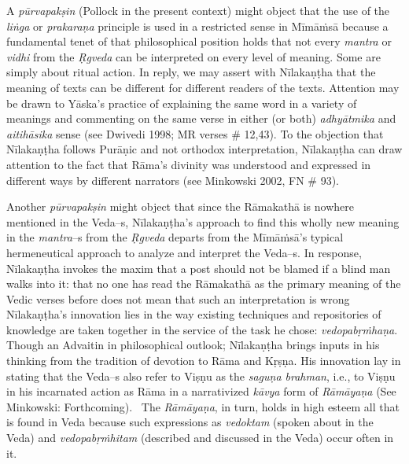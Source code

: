 A \textit{pūrvapakṣin} (Pollock in the present context) might object that the use of the \textit{liṅga} or \textit{prakaraṇa} principle is used in a restricted sense in Mīmāṁsā because a fundamental tenet of that philosophical position holds that not every \textit{mantra} or \textit{vidhi} from the \textit{Ṛgveda} can be interpreted on every level of meaning. Some are simply about ritual action. In reply, we may assert with Nīlakaṇṭha that the meaning of texts can be different for different readers of the texts. Attention may be drawn to Yāska's practice of explaining the same word in a variety of meanings and commenting on the same verse in either (or both) \textit{adhyātmika} and \textit{aitihāsika} sense (see Dwivedi 1998; MR verses \# 12,43). To the objection that Nīlakaṇṭha follows Purāṇic and not orthodox interpretation, Nīlakaṇṭha can draw attention to the fact that Rāma's divinity was understood and expressed in different ways by different narrators (see Minkowski 2002, FN \# 93).

Another \textit{pūrvapakṣin }might object that since the Rāmakathā is nowhere mentioned in the Veda–s, Nīlakaṇṭha’s approach to find this wholly new meaning in the \textit{mantra}–s from the \textit{Ṛgveda} departs from the Mīmāṁsā’s typical hermeneutical approach to analyze and interpret the Veda–s. In response, Nīlakaṇṭha invokes the maxim that a post should not be blamed if a blind man walks into it: that no one has read the Rāmakathā as the primary meaning of the Vedic verses before does not mean that such an interpretation is wrong Nīlakaṇṭha's innovation lies in the way existing techniques and repositories of knowledge are taken together in the service of the task he chose: \textit{vedopabṛṁhaṇa}. Though an Advaitin in philosophical outlook; Nīlakaṇṭha brings inputs in his thinking from the tradition of devotion to Rāma and Kṛṣṇa. His innovation lay in stating that the Veda–s also refer to Viṣṇu as the \textit{saguṇa brahman}, i.e., to Viṣṇu in his incarnated action as Rāma in a narrativized \textit{kāvya} form of \textit{Rāmāyaṇa} (See Minkowski: Forthcoming).  The \textit{Rāmāyaṇa}, in turn, holds in high esteem all that is found in Veda because such expressions as \textit{vedoktam} (spoken about in the Veda) and \textit{vedopabṛṁhitam} (described and discussed in the Veda) occur often in it.


